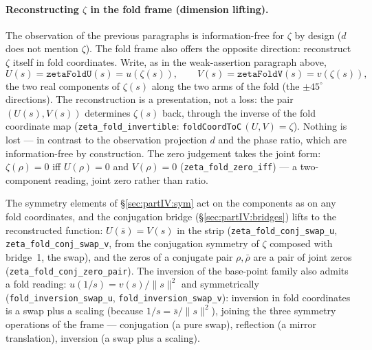 \documentclass{article}
\newcommand{\zt}{\zeta}
\begin{document}
\paragraph{Reconstructing $\zt$ in the fold frame (dimension lifting).}
The observation of the previous paragraphs is information-free for
$\zt$ by design ($d$ does not mention $\zt$). The fold frame also
offers the opposite direction: reconstruct $\zt$ itself in fold
coordinates. Write, as in the weak-assertion paragraph above,
\begin{equation}
  U(s)=\texttt{zetaFoldU}(s)=u(\zt(s)),\qquad
  V(s)=\texttt{zetaFoldV}(s)=v(\zt(s)),
\end{equation}
the two real components of $\zt(s)$ along the two arms of the fold
(the $\pm45^\circ$ directions). The reconstruction is a presentation,
not a loss: the pair $(U(s),V(s))$ determines $\zt(s)$ back, through
the inverse of the fold coordinate map
(\texttt{zeta\_fold\_invertible}: \texttt{foldCoordToC}\,$(U,V)=\zt$).
Nothing is lost --- in contrast to the observation projection $d$ and
the phase ratio, which are information-free by construction. The zero
judgement takes the joint form: $\zt(\rho)=0$ iff $U(\rho)=0$ and
$V(\rho)=0$ (\texttt{zeta\_fold\_zero\_iff}) --- a two-component
reading, joint zero rather than ratio.

The symmetry elements of \S\ref{sec:partIV:sym} act on the components
as on any fold coordinates, and the conjugation bridge
(\S\ref{sec:partIV:bridges}) lifts to the reconstructed function:
$U(\bar s)=V(s)$ in the strip
(\texttt{zeta\_fold\_conj\_swap\_u}, \texttt{zeta\_fold\_conj\_swap\_v},
from the conjugation symmetry of $\zt$ composed with bridge~1, the
swap), and the zeros of a conjugate pair $\rho,\bar\rho$ are a pair of
joint zeros (\texttt{zeta\_fold\_conj\_zero\_pair}). The inversion of
the base-point family also admits a fold reading:
$u(1/s)=v(s)/\|s\|^2$ and symmetrically
(\texttt{fold\_inversion\_swap\_u}, \texttt{fold\_inversion\_swap\_v}):
inversion in fold coordinates is a swap plus a scaling (because
$1/s=\bar s/\|s\|^2$), joining the three symmetry operations of the
frame --- conjugation (a pure swap), reflection (a mirror translation),
inversion (a swap plus a scaling).
\end{document}
